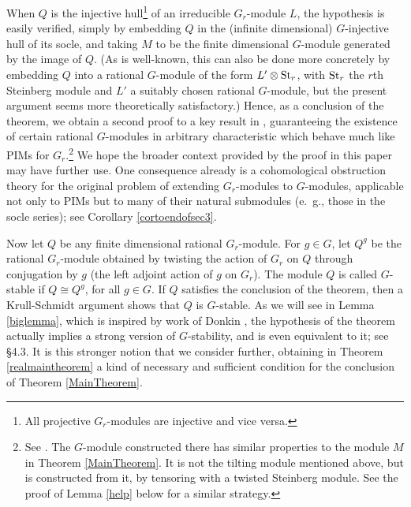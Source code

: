 \documentclass[11pt,leqno,amscd,amssymb,verbatim, url]{amsart}
\theoremstyle{definition}
\numberwithin{equation}{thm}
\newcommand{\St}{\text{\rm St}}
\begin{document}
When $Q$ is the injective hull\footnote{All projective $G_r$-modules are injective and vice versa.} of an irreducible $G_r$-module $L$, the hypothesis is easily verified, simply
by embedding $Q$ in the (infinite dimensional) $G$-injective hull of its socle, and taking
$M$ to be the finite dimensional $G$-module generated by the image of $Q$. (As is well-known, this can also be done more concretely
by embedding $Q$ into a rational $G$-module of the form $L'\otimes \St_r$, with $\St_r$  the $r$th Steinberg module and $L'$ a suitably chosen rational $G$-module,  but the present argument seems more theoretically satisfactory.) Hence, as a conclusion of the theorem,
we obtain a second proof to a key result in  \cite{PS}, guaranteeing the existence of certain rational $G$-modules in arbitrary
characteristic which behave much like PIMs for $G_r$.\footnote{See \cite[Cor. A.5]{PS}. The $G$-module constructed there has similar properties
                to the module $M$ in Theorem \ref{MainTheorem}. It is not the tilting module mentioned above, but is
                constructed from it, by tensoring with a twisted Steinberg module.  See the proof of Lemma 
                \ref{help} below for a similar strategy.}  We hope the broader context provided by
                the proof in this paper may have
further use. One consequence already is a cohomological obstruction theory for the original problem of extending $G_r$-modules to $G$-modules, applicable
not only to PIMs but to many of their natural submodules (e.~g., those in the socle series); see Corollary \ref{cortoendofsec3}.


Now let $Q$ be any finite dimensional rational $G_r$-module. For $g\in G$, let $Q^g$ be the rational $G_r$-module obtained by twisting the action of $G_r$ on $Q$ through
conjugation by $g$ (the left adjoint action of $g$ on $G_r$). The module $Q$ is called $G$-stable if $Q\cong Q^g$, for all $g\in G$. If
$Q$ satisfies the conclusion of the theorem, then a Krull-Schmidt argument shows that $Q$ is $G$-stable. As we will see
in Lemma \ref{biglemma}, which is inspired by work of Donkin \cite{Donkin1}, the hypothesis of the theorem actually
implies a strong version of $G$-stability, and is even equivalent to it; see \S4.3. It is this stronger notion that we consider further, obtaining in Theorem \ref{realmaintheorem}
a kind of necessary and sufficient condition for the conclusion of Theorem \ref{MainTheorem}.
\end{document}

